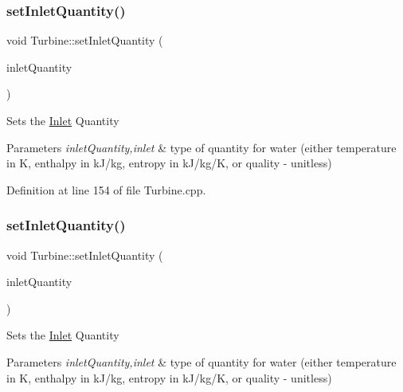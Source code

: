 \subsubsection{\texorpdfstring{set\+Inlet\+Quantity()}{setInletQuantity()}\hspace{0.1cm}{\footnotesize\ttfamily [1/3]}}
{\footnotesize\ttfamily void Turbine\+::set\+Inlet\+Quantity (\begin{DoxyParamCaption}\item[{\hyperlink{class_steam_properties_ae0294bedf7d178c2d8fb6aed0f62fbff}{Steam\+Properties\+::\+Thermodynamic\+Quantity}}]{inlet\+Quantity }\end{DoxyParamCaption})}

Sets the \hyperlink{class_inlet}{Inlet} Quantity


\begin{DoxyParams}{Parameters}
{\em inlet\+Quantity,inlet} & type of quantity for water (either temperature in K, enthalpy in k\+J/kg, entropy in k\+J/kg/K, or quality -\/ unitless) \\
\hline
\end{DoxyParams}


Definition at line 154 of file Turbine.\+cpp.

\mbox{\label{class_turbine_aecc05c70870fb11bbc0bb4fe5d8438bd}} 
\subsubsection{\texorpdfstring{set\+Inlet\+Quantity()}{setInletQuantity()}\hspace{0.1cm}{\footnotesize\ttfamily [2/3]}}
{\footnotesize\ttfamily void Turbine\+::set\+Inlet\+Quantity (\begin{DoxyParamCaption}\item[{\hyperlink{class_steam_properties_ae0294bedf7d178c2d8fb6aed0f62fbff}{Steam\+Properties\+::\+Thermodynamic\+Quantity}}]{inlet\+Quantity }\end{DoxyParamCaption})}

Sets the \hyperlink{class_inlet}{Inlet} Quantity


\begin{DoxyParams}{Parameters}
{\em inlet\+Quantity,inlet} & type of quantity for water (either temperature in K, enthalpy in k\+J/kg, entropy in k\+J/kg/K, or quality -\/ unitless) \\
\hline
\end{DoxyParams}
\mbox{\label{class_turbine_aecc05c70870fb11bbc0bb4fe5d8438bd}} 
